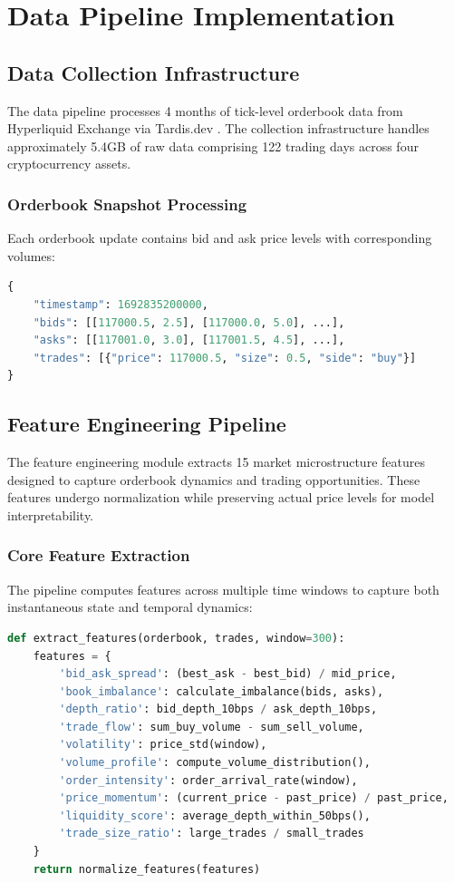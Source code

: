 \documentclass{report}
\begin{document}
\section{Data Pipeline Implementation}

\subsection{Data Collection Infrastructure}

The data pipeline processes 4 months of tick-level orderbook data from Hyperliquid Exchange via Tardis.dev \cite{Tardis2024}. The collection infrastructure handles approximately 5.4GB of raw data comprising 122 trading days across four cryptocurrency assets.

\subsubsection{Orderbook Snapshot Processing}

Each orderbook update contains bid and ask price levels with corresponding volumes:

\begin{lstlisting}[language=Python, caption=Orderbook data structure]
{
    "timestamp": 1692835200000,
    "bids": [[117000.5, 2.5], [117000.0, 5.0], ...],
    "asks": [[117001.0, 3.0], [117001.5, 4.5], ...],
    "trades": [{"price": 117000.5, "size": 0.5, "side": "buy"}]
}
\end{lstlisting}

\subsection{Feature Engineering Pipeline}

The feature engineering module extracts 15 market microstructure features designed to capture orderbook dynamics and trading opportunities. These features undergo normalization while preserving actual price levels for model interpretability.

\subsubsection{Core Feature Extraction}

The pipeline computes features across multiple time windows to capture both instantaneous state and temporal dynamics:

\begin{lstlisting}[language=Python, caption=Feature extraction implementation]
def extract_features(orderbook, trades, window=300):
    features = {
        'bid_ask_spread': (best_ask - best_bid) / mid_price,
        'book_imbalance': calculate_imbalance(bids, asks),
        'depth_ratio': bid_depth_10bps / ask_depth_10bps,
        'trade_flow': sum_buy_volume - sum_sell_volume,
        'volatility': price_std(window),
        'volume_profile': compute_volume_distribution(),
        'order_intensity': order_arrival_rate(window),
        'price_momentum': (current_price - past_price) / past_price,
        'liquidity_score': average_depth_within_50bps(),
        'trade_size_ratio': large_trades / small_trades
    }
    return normalize_features(features)
\end{lstlisting}
\end{document}
